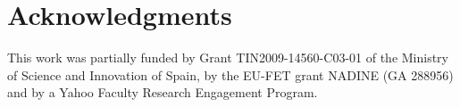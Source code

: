 \documentclass{sig-alternate-2013}
\begin{document}
\section{Acknowledgments} 
This work was partially funded by Grant TIN2009-14560-C03-01 of the Ministry of Science and Innovation of Spain, by the EU-FET grant NADINE (GA 288956) and by a Yahoo Faculty Research Engagement Program. 

\balance
{\small

}
\end{document}
